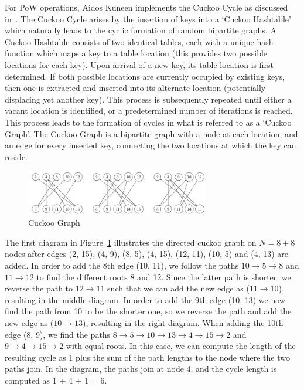 \documentclass[a4paper,10pt,twocolumn]{article}
\begin{document}
For PoW operations, Aidos Kuneen implements the Cuckoo Cycle as discussed in~\cite{cuckoo}. The Cuckoo Cycle arises by the insertion of
keys into a `Cuckoo Hashtable' which naturally leads to the cyclic formation of random bipartite graphs. A Cuckoo Hashtable consists of 
two identical tables, each with a unique hash function which maps a key to a table location (this provides two possible locations for 
each key). Upon arrival of a new key, its table location is first determined. If both possible locations are currently occupied by 
existing keys, then one is extracted and inserted into its alternate location (potentially displacing yet another key). This process is 
subsequently repeated until either a vacant location is identified, or a predetermined number of iterations is reached. This process 
leads to the formation of cycles in what is referred to as a `Cuckoo Graph'. The Cuckoo Graph is a bipartite graph with a node at each 
location, and an edge for every inserted key, connecting the two locations at which the key can reside.

\begin{figure}[ht]
	\begin{center}
	\includegraphics[width=80mm]{cuckoo.png}
	  \caption{Cuckoo Graph}
    \label{fig:cuckoo}
	\end{center}
 \end{figure}

The first diagram in Figure~\ref{fig:cuckoo} illustrates the directed cuckoo graph on \( N = 8 + 8 \) nodes after edges (2, 15), (4, 
9), (8, 5), (4, 15), (12, 11), (10, 5) and (4, 13) are added. In order to add the 8th edge (10, 11), we follow the paths \( 10 
\rightarrow 5 \rightarrow 8 \) and \( 11 \rightarrow 12 \) to find the different roots 8 and 12. Since the latter path is shorter, we 
reverse the path to \( 12 \rightarrow 11\) such that we can add the new edge as (\( 11 \rightarrow 10\)), resulting in the middle 
diagram. In order to add the 9th edge (10, 13) we now find the path from 10 to be the shorter one, so we reverse the path and add the 
new edge as (\( 10 \rightarrow 13\)), resulting in the right diagram. When adding the 10th edge (8, 9), we find the paths
 \( 8 \rightarrow 5 \rightarrow 10 \rightarrow 13 \rightarrow 4  \rightarrow 15 \rightarrow 2 \) and \( 9 \rightarrow 4 \rightarrow 15 
 \rightarrow 2 \)  with equal roots. In this case, we can compute the length of the resulting cycle as 1 plus the sum of the path lengths to the node where the two paths join. In the diagram, the paths join at node 4, and the cycle length is computed as 1 + 4 + 1 
 = 6.
\end{document}
